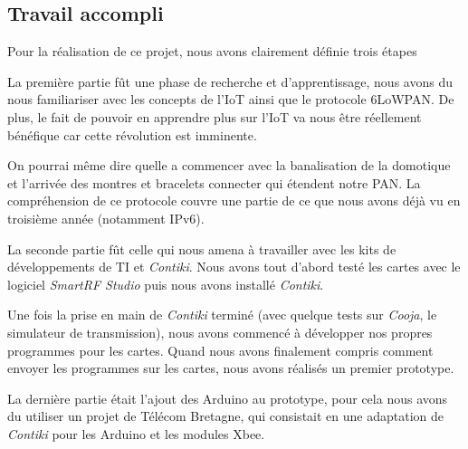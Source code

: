 
\subsection{Travail accompli}

Pour la réalisation de ce projet, nous avons clairement définie trois étapes

La première partie fût une phase de recherche et d'apprentissage, nous avons du nous familiariser avec les concepts de l'IoT ainsi que le protocole 6LoWPAN.
De plus, le fait de pouvoir en apprendre plus sur l'IoT va nous être réellement bénéfique car cette révolution est imminente.

On pourrai même dire quelle a commencer avec la banalisation de la domotique et l'arrivée des montres et bracelets connecter qui étendent notre PAN.
La compréhension de ce protocole couvre une partie de ce que nous avons déjà vu en troisième année (notamment IPv6).

La seconde partie fût celle qui nous amena à travailler avec les kits de développements de TI et \textit{Contiki}. Nous avons tout d'abord testé les cartes avec le logiciel \textit{SmartRF Studio} puis nous avons installé \textit{Contiki}.

Une fois la prise en main de \textit{Contiki} terminé (avec quelque tests sur \textit{Cooja}, le simulateur de transmission), nous avons commencé à développer nos propres programmes pour les cartes. Quand nous avons finalement compris comment envoyer les programmes sur les cartes, nous avons réalisés un premier prototype.

La dernière partie était l'ajout des Arduino au prototype, pour cela nous avons du utiliser un projet de Télécom Bretagne, qui consistait en une adaptation de \textit{Contiki} pour les Arduino et les modules Xbee.
